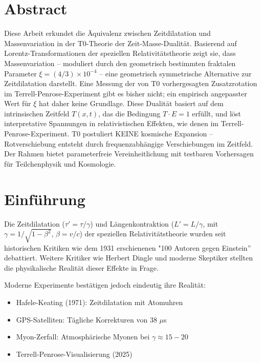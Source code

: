 \section*{Abstract}
		Diese Arbeit erkundet die Äquivalenz zwischen Zeitdilatation und Massenvariation in der T0-Theorie der Zeit-Masse-Dualität. Basierend auf Lorentz-Transformationen der speziellen Relativitätstheorie zeigt sie, dass Massenvariation – moduliert durch den geometrisch bestimmten fraktalen Parameter $\xi = (4/3) \times 10^{-4}$ – eine geometrisch symmetrische Alternative zur Zeitdilatation darstellt. Eine Messung der von T0 vorhergesagten Zusatzrotation im Terrell-Penrose-Experiment gibt es bisher nicht; ein empirisch angepasster Wert für $\xi$ hat daher keine Grundlage. Diese Dualität basiert auf dem intrinsischen Zeitfeld $T(x,t)$, das die Bedingung $T \cdot E = 1$ erfüllt, und löst interpretative Spannungen in relativistischen Effekten, wie denen im Terrell-Penrose-Experiment. T0 postuliert KEINE kosmische Expansion – Rotverschiebung entsteht durch frequenzabhängige Verschiebungen im Zeitfeld. Der Rahmen bietet parameterfreie Vereinheitlichung mit testbaren Vorhersagen für Teilchenphysik und Kosmologie.

	
	\section{Einführung}
	Die Zeitdilatation ($\tau' = \tau / \gamma$) und Längenkontraktion ($L' = L / \gamma$, mit $\gamma = 1 / \sqrt{1 - \beta^2}$, $\beta = v/c$) der speziellen Relativitätstheorie wurden seit historischen Kritiken wie dem 1931 erschienenen "100 Autoren gegen Einstein'' \cite{hundert1931} debattiert. Weitere Kritiker wie Herbert Dingle \cite{dingle1972} und moderne Skeptiker \cite{gift2010} stellten die physikalische Realität dieser Effekte in Frage. 
	
	Moderne Experimente bestätigen jedoch eindeutig ihre Realität:
	\begin{itemize}
		\item Hafele-Keating (1971): Zeitdilatation mit Atomuhren \cite{hafele1972}
		\item GPS-Satelliten: Tägliche Korrekturen von 38 $\mu$s \cite{ashby2003}
		\item Myon-Zerfall: Atmosphärische Myonen bei $\gamma \approx 15-20$ \cite{rossi1941}
		\item Terrell-Penrose-Visualisierung (2025) \cite{terrell2025}
	\end{itemize}
	

